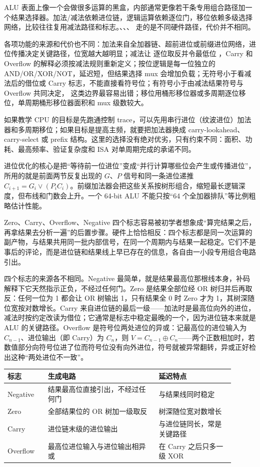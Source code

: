 ALU 表面上像一个会做很多运算的黑盒，内部通常更像若干条专用组合路径加一个结果选择器。加法/减法依赖进位链，逻辑运算依赖逐位门，移位依赖多级选择网络，比较往往复用减法路径和标志。、、、 走的是不同硬件路径，代价并不相同。

各项功能的来源和代价也不同：加法来自全加器链、超前进位或前缀进位网络，进位传播决定关键路径，位宽越大越明显；减法让  逐位取反并令最低位 ，Carry 和 Overflow 的解释必须按减法规则重新定义；按位逻辑是每一位独立的 AND/OR/XOR/NOT，延迟短，但结果选择 mux 会增加负载；无符号小于看减法后的借位或 Carry 标志，不能直接看符号位；有符号小于由减法结果符号与 Overflow 共同决定， 这类边界最容易出错；移位用桶形移位器或多周期逐位移位，单周期桶形移位器面积和 mux 级数较大。

如果教学 CPU 的目标是先跑通控制 trace，可以先用串行进位（纹波进位）加法器和多周期移位；如果目标是提高主频，就要把加法器换成 carry-lookahead、carry-select 或 prefix 结构。这里的选择没有绝对优劣，只有约束不同：面积、功耗、最高频率、验证复杂度和 ISA 对单周期完成的承诺不同。

进位优化的核心是把“等待前一位进位”变成“并行计算哪些位会产生或传播进位”，所用的就是前面两节反复出现的 \(G\)、\(P\) 信号和同一条进位递推 \(C_{i+1}=G_i\lor(P_iC_i)\)。前缀加法器会把这些关系按树形组合，缩短最长逻辑深度，但布线和门数会上升。一个 64-bit ALU 不能只按“64 个全加器排队”等比例粗略估计性能。

Zero、Carry、Overflow、Negative 四个标志容易被初学者想象成“算完结果之后，再拿结果去分析一遍”的后置步骤。硬件上恰恰相反：四个标志都是同一次运算的副产物，与结果共用同一批内部信号，在同一个周期内与结果一起稳定。它们不是事后的评论，而是进位链和结果线上早已存在的信息，各自由一小段专用组合电路引出。

四个标志的来源各不相同。Negative 最简单，就是结果最高位那根线本身，补码解释下它天然指示正负，不经过任何门。Zero 是结果全部位经 OR 树归并后再取反：任何一位为 1 都会让 OR 树输出 1，只有结果全 0 时 Zero 才为 1，其树深随位宽按对数增长。Carry 来自进位链的最后一级——加法时是最高位向外的进位，减法时按约定改读为借位；它通常是标志中稳定最晚的一个，因为进位链本来就是 ALU 的关键路径。Overflow 是符号位两处进位的异或：记最高位的进位输入为 \(C_{n-1}\)、进位输出（即 Carry）为 \(C_n\)，则 \(V=C_{n-1}\oplus C_n\)——两个正数相加时，若数值部分向符号位进了位而符号位没有向外进位，符号就被异常翻转，异或正好检出这种“两处进位不一致”。

\begin{longtable}{L{0.16\linewidth}L{0.44\linewidth}L{0.3\linewidth}}
\toprule
标志 & 生成电路 & 延迟特点 \\
\midrule
Negative & 结果最高位直接引出，不经过任何门 & 与结果线同时稳定 \\
Zero & 全部结果位的 OR 树加一级取反 & 树深随位宽对数增长 \\
Carry & 进位链末级的进位输出 & 与进位链同长，常是关键路径 \\
Overflow & 最高位进位输入与进位输出相异或 & 在 Carry 之后只多一级 XOR \\
\bottomrule
\end{longtable}

